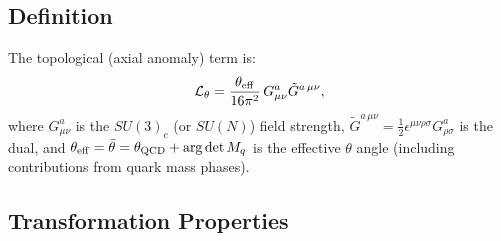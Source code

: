 \documentclass[12pt,a4paper]{article}
\theoremstyle{definition}
\theoremstyle{remark}
\begin{document}
\subsection{Definition}

The topological (axial anomaly) term is:
\begin{equation}
  \mathcal{L}_\theta
  = \frac{\theta_{\rm eff}}{16\pi^2}\,G^a_{\mu\nu}\tilde G^{a\,\mu\nu},
  \label{eq:cp:theta_term}
\end{equation}
where $G^a_{\mu\nu}$ is the $SU(3)_c$ (or $SU(N)$) field strength,
$\tilde G^{a\,\mu\nu} = \frac{1}{2}\epsilon^{\mu\nu\rho\sigma}G^a_{\rho\sigma}$
is the dual, and $\theta_{\rm eff} = \bar\theta = \theta_{\rm QCD} + \arg\det M_q$
is the effective $\theta$ angle (including contributions from quark mass phases).

\subsection{Transformation Properties}
\end{document}
